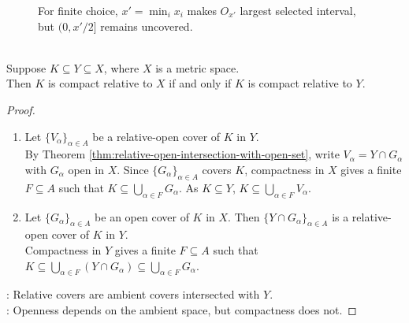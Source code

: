 \begin{figure}[H]
  \centering
  
  \caption{For finite choice, $x'=\min_i x_i$ makes $O_{x'}$ largest selected interval, but $(0,x'/2]$ remains uncovered.}
  \label{fig:open-cover-no-finite-subcover}
\end{figure}

\begin{theorem} \label{thm:compactness-independent-of-ambient-space} \\
Suppose $K\subseteq Y\subseteq X$, where $X$ is a metric space.\\
Then $K$ is compact relative to $X$ if and only if $K$ is compact relative to $Y$.
\begin{proof}
\begin{enumerate}[label=\roman*.]
\setlength{\itemsep}{0pt}
\item[$(\Rightarrow)$] Let $\{V_\alpha\}_{\alpha\in A}$ be a relative-open cover of $K$ in $Y$.\\
By Theorem \ref{thm:relative-open-intersection-with-open-set}, write $V_\alpha=Y\cap G_\alpha$ with $G_\alpha$ open in $X$. Since $\{G_\alpha\}_{\alpha\in A}$ covers $K$, compactness in $X$ gives a finite $F\subseteq A$ such that $K\subseteq\bigcup_{\alpha\in F}G_\alpha$. As $K\subseteq Y$, $K\subseteq\bigcup_{\alpha\in F}V_\alpha$.
\item[$(\Leftarrow)$] Let $\{G_\alpha\}_{\alpha\in A}$ be an open cover of $K$ in $X$. Then $\{Y\cap G_\alpha\}_{\alpha\in A}$ is a relative-open cover of $K$ in $Y$.\\
Compactness in $Y$ gives a finite $F\subseteq A$ such that $K\subseteq\bigcup_{\alpha\in F}(Y\cap G_\alpha)\subseteq\bigcup_{\alpha\in F}G_\alpha$.
\end{enumerate}
: Relative covers are ambient covers intersected with $Y$.\\
: Openness depends on the ambient space, but compactness does not.
\end{proof}
\end{theorem}

